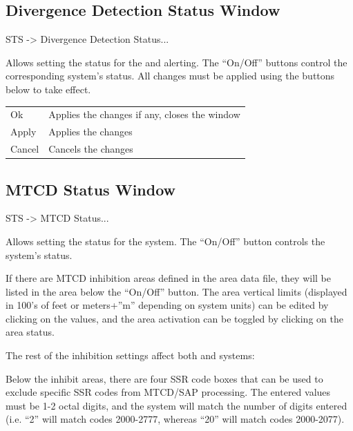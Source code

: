 \documentclass[a4paper,oneside,11pt]{memoir}
\begin{document}
\subsection{Divergence Detection Status Window}
\label{win:ddsw}

 STS -> Divergence Detection Status...

\bigskip


Allows setting the status for the  and  alerting. The “On/Off” buttons control the corresponding system’s status. All changes must be applied using the buttons below to take effect.

\begin{longtable}{p{2.5cm} p{10cm}}
    Ok      & Applies the changes if any, closes the window\\
    Apply   & Applies the changes\\
    Cancel  & Cancels the changes\\
\end{longtable}

\subsection{MTCD Status Window}
\label{win:mtcdsw}

 STS -> MTCD Status...

\bigskip


Allows setting the status for the  system. The “On/Off” button controls the system’s status.

\bigskip

If there are MTCD inhibition areas defined in the area data file, they will be listed in the area below the “On/Off” button. The area vertical limits (displayed in 100’s of feet or meters+”m” depending on system units) can be edited by clicking on the values, and the area activation can be toggled by clicking on the area status.

\bigskip

The rest of the inhibition settings affect both  and  systems:

\bigskip

Below the inhibit areas, there are four SSR code boxes that can be used to exclude specific SSR codes from MTCD/SAP processing. The entered values must be 1-2 octal digits, and the system will match the number of digits entered (i.e. “2” will match codes 2000-2777, whereas “20” will match codes 2000-2077).
\end{document}
